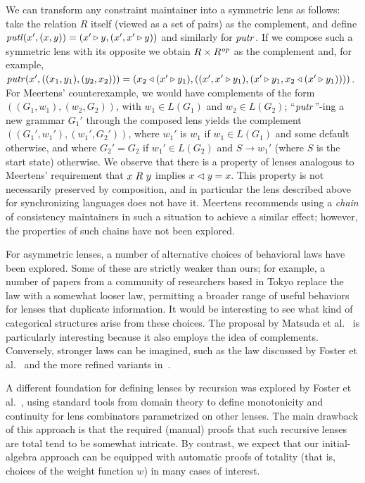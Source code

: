 We can transform any constraint maintainer into a  symmetric lens as
follows: take the relation $R$ itself (viewed as a set of pairs) as
the complement, and define $\mathit{putl}(x',(x,y))=(x'\triangleright
y,(x',x'\triangleright y))$ and similarly 
for $\mathit{putr}$. If we compose such a symmetric lens with its opposite
we obtain $R\times R^\mathit{op}$ as the complement and, for example,
$\mathit{putr}(x',((x_1,y_1),(y_2,x_2))) = 
(x_2\triangleleft(x'\triangleright y_1), ((x',x'\triangleright
y_1),(x'\triangleright y_1,x_2\triangleleft(x'\triangleright y_1))))$. 
%
For Meertens' counterexample, we would have complements of the form
$((G_1,w_1),(w_2,G_2))$, with $w_1\in L(G_1)$
and $w_2\in L(G_2)$; ``$\mathit{putr}$''-ing a new grammar
$G_1'$ through the composed lens yields the complement
$((G_1',w_1'),(w_1',G_2'))$, where $w_1'$ is $w_1$ if $w_1\in L(G_1)$ and
some default otherwise, and where $G_2'=G_2$ if $w_1'\in L(G_2)$ and
$S{\rightarrow}w_1'$ (where $S$ is the start state) otherwise. We observe
that there is a property of lenses analogous to Meertens' requirement that
$x \mathrel{R_{}} y$ implies $x \triangleleft y = x$. This property is not
necessarily preserved by composition, and in particular the lens described
above for synchronizing languages does not have it.
%
Meertens recommends using a {\em chain} of consistency maintainers in such a
situation to achieve a similar effect; however, the properties of such
chains have not been explored.


For asymmetric lenses, a number of alternative \iffull choices of behavioral
\fi
laws 
have been explored.  Some of these are \iffull strictly \fi weaker than ours; for
example, a number of papers from a community of researchers based in Tokyo
replace the  law with a somewhat looser  law,
permitting a broader range of useful behaviors for lenses that duplicate
information.  It would be interesting to see what kind of categorical
structures arise from these choices.  The proposal by Matsuda et
al.~\cite{matsuda2007btb} is particularly interesting because it also employs
the idea of complements.  Conversely, stronger laws can be imagined, such as
the  law discussed by Foster et
al.~\cite{Focal2005-shortcite}\iffull{} and the more refined variants
in~\cite{updatable-security-views}\fi\iflater{}\fi.

A different foundation for defining lenses by recursion was explored by
Foster et al.~\cite{Focal2005-shortcite}, using standard tools from domain
theory to define monotonicity and continuity for lens combinators
parametrized on other lenses.  The main drawback of this approach is that
the required (manual) proofs that such recursive lenses are total tend to be
somewhat intricate.  By contrast, we expect that our initial-algebra
approach can be equipped with automatic proofs of totality (that is, choices
of the weight function $w$) in many cases of interest.

